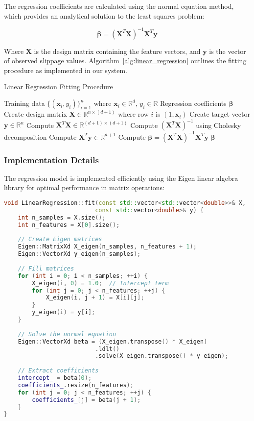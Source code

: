 \documentclass[10pt,twocolumn,a4paper]{IEEEtran}
\begin{document}
The regression coefficients are calculated using the normal equation method, which provides an analytical solution to the least squares problem:

\begin{equation}
\mathbf{\beta} = (\mathbf{X}^T\mathbf{X})^{-1}\mathbf{X}^T\mathbf{y}
\end{equation}

Where $\mathbf{X}$ is the design matrix containing the feature vectors, and $\mathbf{y}$ is the vector of observed slippage values. Algorithm~\ref{alg:linear_regression} outlines the fitting procedure as implemented in our system.

\begin{algorithm}
\caption{Linear Regression Fitting Procedure}
\label{alg:linear_regression}
\begin{algorithmic}[1]
\REQUIRE Training data $\{(\mathbf{x}_i, y_i)\}_{i=1}^n$ where $\mathbf{x}_i \in \mathbb{R}^d$, $y_i \in \mathbb{R}$
\ENSURE Regression coefficients $\mathbf{\beta}$
\STATE Create design matrix $\mathbf{X} \in \mathbb{R}^{n \times (d+1)}$ where row $i$ is $(1, \mathbf{x}_i)$
\STATE Create target vector $\mathbf{y} \in \mathbb{R}^n$
\STATE Compute $\mathbf{X}^T\mathbf{X} \in \mathbb{R}^{(d+1) \times (d+1)}$
\STATE Compute $(\mathbf{X}^T\mathbf{X})^{-1}$ using Cholesky decomposition
\STATE Compute $\mathbf{X}^T\mathbf{y} \in \mathbb{R}^{d+1}$
\STATE Compute $\mathbf{\beta} = (\mathbf{X}^T\mathbf{X})^{-1}\mathbf{X}^T\mathbf{y}$
\RETURN $\mathbf{\beta}$
\end{algorithmic}
\end{algorithm}

\subsubsection{Implementation Details}
The regression model is implemented efficiently using the Eigen linear algebra library for optimal performance in matrix operations:

\begin{lstlisting}[language=C++, caption=Linear Regression Implementation]
void LinearRegression::fit(const std::vector<std::vector<double>>& X, 
                          const std::vector<double>& y) {
    int n_samples = X.size();
    int n_features = X[0].size();
    
    // Create Eigen matrices
    Eigen::MatrixXd X_eigen(n_samples, n_features + 1);
    Eigen::VectorXd y_eigen(n_samples);
    
    // Fill matrices
    for (int i = 0; i < n_samples; ++i) {
        X_eigen(i, 0) = 1.0;  // Intercept term
        for (int j = 0; j < n_features; ++j) {
            X_eigen(i, j + 1) = X[i][j];
        }
        y_eigen(i) = y[i];
    }
    
    // Solve the normal equation
    Eigen::VectorXd beta = (X_eigen.transpose() * X_eigen)
                          .ldlt()
                          .solve(X_eigen.transpose() * y_eigen);
    
    // Extract coefficients
    intercept_ = beta(0);
    coefficients_.resize(n_features);
    for (int j = 0; j < n_features; ++j) {
        coefficients_[j] = beta(j + 1);
    }
}
\end{lstlisting}
\end{document}
